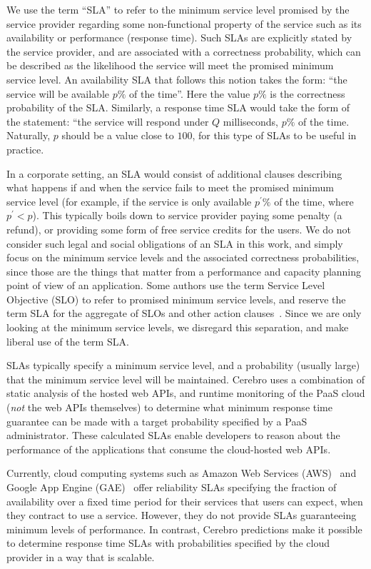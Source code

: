 We use the term ``SLA'' to refer to the minimum service level promised by the
service provider regarding some non-functional property of the service such as
its availability or performance (response time). Such SLAs are explicitly
stated by the service provider, and are associated with a correctness probability,
which can be described as the likelihood the service will meet the promised
minimum service level. An availability SLA that follows this notion
takes the form: ``the service will be available $p\%$ of the time''.
Here the value $p\%$ is the correctness probability of the SLA. Similarly, a
response time SLA would take the form of the statement: ``the service will respond 
under $Q$ milliseconds, $p\%$ of the time. Naturally, $p$ should be a value close
to $100$, for this type of SLAs to be useful in practice. 

In a corporate setting, an 
SLA would consist of additional clauses describing what happens if and when the
service fails to meet the promised minimum service level (for example, if the
service is only available $p^\prime\%$ of the time, where $p^\prime < p$). This
typically boils down to service provider paying some penalty (a refund), or 
providing some form of free service credits for the users. We do not consider such
legal and social obligations of an SLA in this work, and simply focus on the
minimum service levels and the associated correctness probabilities, since those
are the things that matter from a performance and capacity planning point of view
of an application. Some authors use the term Service Level Objective (SLO) to
refer to promised minimum service levels, and reserve the term SLA for the
aggregate of SLOs and other action clauses~\cite{Keller:2003:WFS:635430.635442}.
Since we are only looking at the minimum service levels, we disregard this
separation, and make liberal use of the term SLA.

SLAs typically specify a minimum service level, and a
probability (usually large) that the minimum service level will be
maintained. Cerebro uses a combination of static analysis of the hosted web APIs, 
and runtime monitoring of the PaaS cloud (\textit{not} the web APIs themselves) 
to determine what minimum response time guarantee can be made 
with a target probability specified by a PaaS administrator. These calculated
SLAs enable developers to
reason about the performance of the applications that consume the cloud-hosted
web APIs.

Currently, cloud computing systems such as Amazon Web Services
(AWS)~\cite{amazon-aws-web} and
Google App Engine (GAE)~\cite{gae} offer reliability SLAs specifying the fraction of
availability over a fixed time period for their services
that users can expect, when they contract to use a service. However, they do not provide SLAs
guaranteeing minimum levels of performance.
In contrast, Cerebro predictions make it possible to determine response time SLAs with
probabilities specified by the cloud provider in a way that is scalable.

